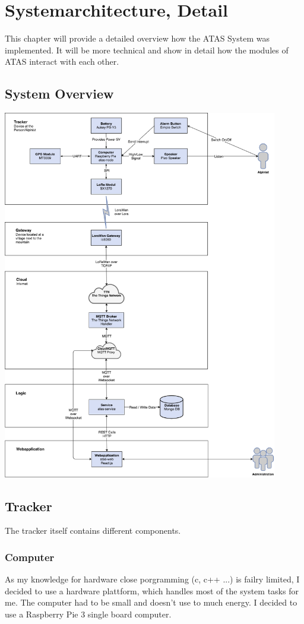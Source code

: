 \documentclass[a4paper,11pt, oneside]{report}
\theoremstyle{definition}
\begin{document}
\chapter{Systemarchitecture, Detail}
This chapter will provide a detailed overview how the ATAS System was implemented. It will be more technical and show in detail how the modules of ATAS interact with each other.


\newpage
\noindent
\section{System Overview}
\includegraphics[width=0.9\textwidth]{img/ATAS_SystemOverview_Detail.png}

\newpage
\section{Tracker}
The tracker itself contains different components.

\subsection{Computer}
As my knowledge for hardware close porgramming (c, c++ ...) is failry limited, I decided to use a hardware plattform, which handles most of the system tasks for me. The computer had to be small and doesn't use to much energy. I decided to use a Raspberry Pie 3  single board computer.
\end{document}
